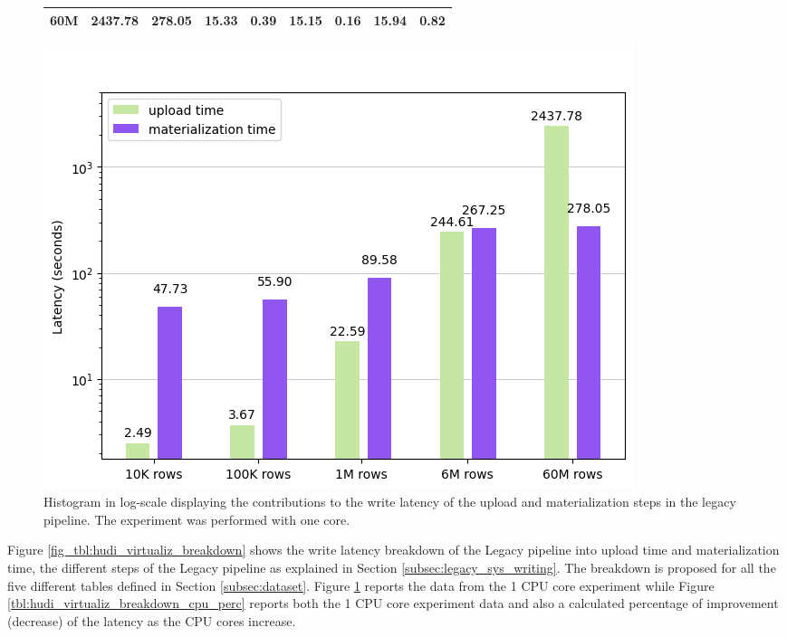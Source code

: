 \begin{figure}
\begin{minipage}[b]{\textwidth}
\begin{tabular}{r S[table-format=4.2] S[table-format=4.2] S[table-format=2.2] S[table-format=2.2] S[table-format=2.2] S[table-format=2.2] S[table-format=2.2] S[table-format=2.2]}
            60M &  2437.78 & 278.05 & 15.33 & 0.39 & 15.15 & 0.16 & 15.94 & 0.82\\
            \bottomrule
        \end{tabular}
    \end{minipage}
    \begin{minipage}[b]{\textwidth}
        \includegraphics[width=\textwidth]{figures/5-results/hudi_virtualiz_1_core.png}
        \caption[Histogram of the write on legacy pipeline - Time breakdown - 1 core]{Histogram in log-scale displaying the contributions to the write latency of the upload and materialization steps in the legacy pipeline. The experiment was performed with one  core.}
        \label{fig:hudi_virtualiz_breakdown}
    \end{minipage}
\end{figure}
Figure \ref{fig_tbl:hudi_virtualiz_breakdown} shows the write latency breakdown of the Legacy pipeline into upload time and materialization time, the different steps of the Legacy pipeline as explained in Section \ref{subsec:legacy_sys_writing}. The breakdown is proposed for all the five different tables defined in Section \ref{subsec:dataset}. Figure \ref{fig:hudi_virtualiz_breakdown} reports the data from the 1 \gls{CPU} core experiment while Figure \ref{tbl:hudi_virtualiz_breakdown_cpu_perc} reports both the 1 \gls{CPU} core experiment data and also a calculated percentage of improvement (decrease) of the latency as the \gls{CPU} cores increase.

